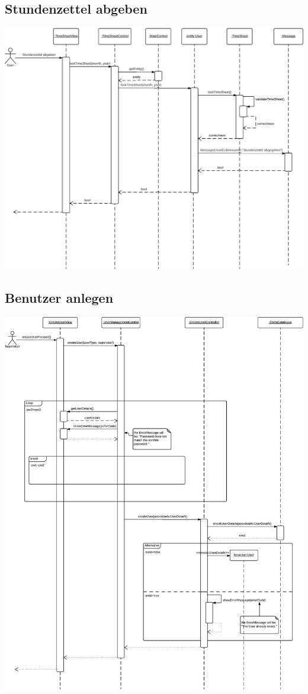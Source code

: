     \subsection{Stundenzettel abgeben}
        \includegraphics[width=\linewidth]{Diagramms/sequenzes/send_in_timesheet.pdf}\\
    \subsection{Benutzer anlegen}
        \includegraphics[width=\linewidth]{Diagramms/sequenzes/create_user.pdf}\\
